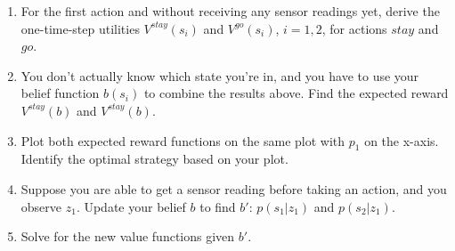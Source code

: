 \documentclass[12pt]{article}
\begin{document}
\begin{enumerate}

\item For the first action and without receiving any sensor readings
  yet, derive the one-time-step utilities $V^{stay}(s_i)$ and
  $V^{go}(s_i)$, $i=1,2$, for actions $stay$ and $go$.

\item You don't actually know which state you're in, and you have to
  use your belief function $b(s_i)$ to combine the results above.
  Find the expected reward $V^{stay}(b)$ and $V^{stay}(b)$.

\item Plot both expected reward functions on the same plot with $p_1$
  on the x-axis.  Identify the optimal strategy based on your plot.

\item Suppose you are able to get a sensor reading before taking an
  action, and you observe $z_1$.  Update your belief $b$ to find $b'$:
  $p(s_1 | z_1)$ and $p(s_2 | z_1)$.

\item Solve for the new value functions given $b'$.

\end{enumerate}
\end{document}
